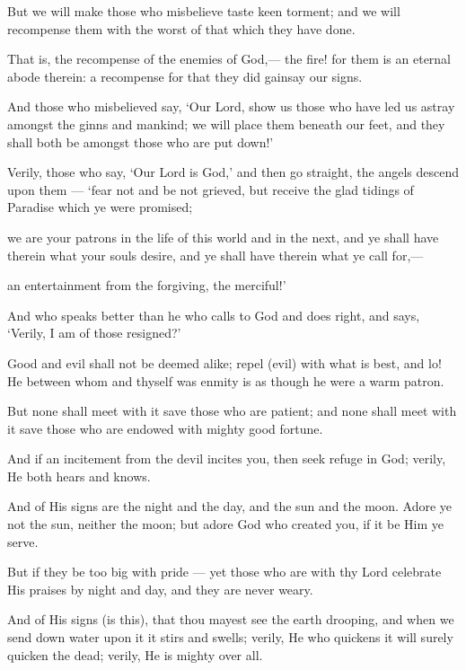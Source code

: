 \documentclass[fontsize=14pt, letterpaper, notitlepage, openany, DIV=12]{scrbook} %
\begin{document}
\noindent[41:27]
But we will make those who misbelieve taste keen torment; and we will recompense
them with the worst of that which they have done.

\noindent[41:28]
That is, the recompense of the enemies of God,--- the fire! for them is an eternal abode
therein: a recompense for that they did gainsay our signs.

\noindent[41:29]
And those who misbelieved say, `Our Lord, show us those who have led us astray
amongst the ginns and mankind; we will place them beneath our feet, and they shall both be
amongst those who are put down!'

\noindent[41:30]
Verily, those who say, `Our Lord is God,' and then go straight, the angels descend upon
them --- `fear not and be not grieved, but receive the glad tidings of Paradise which ye were
promised;

\noindent[41:31]
we are your patrons in the life of this world and in the next, and ye shall have therein
what your souls desire, and ye shall have therein what ye call for,---

\noindent[41:32]
an entertainment from the forgiving, the merciful!'

\noindent[41:33]
And who speaks better than he who calls to God and does right, and says, `Verily, I am of
those resigned?'

\noindent[41:34]
Good and evil shall not be deemed alike; repel (evil) with what is best, and lo! He
between whom and thyself was enmity is as though he were a warm patron.

\noindent[41:35]
But none shall meet with it save those who are patient; and none shall meet with it save
those who are endowed with mighty good fortune.

\noindent[41:36]
And if an incitement from the devil incites you, then seek refuge in God; verily, He both
hears and knows.

\noindent[41:37]
And of His signs are the night and the day, and the sun and the moon. Adore ye not the
sun, neither the moon; but adore God who created you, if it be Him ye serve.

\noindent[41:38]
But if they be too big with pride --- yet those who are with thy Lord celebrate His praises
by night and day, and they are never weary.

\noindent[41:39]
And of His signs (is this), that thou mayest see the earth drooping, and when we send
down water upon it it stirs and swells; verily, He who quickens it will surely quicken the dead;
verily, He is mighty over all.
\end{document}

